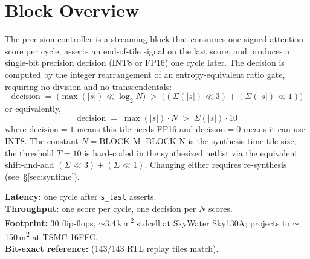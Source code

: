 \documentclass[11pt]{article}
\begin{document}
\tableofcontents
\clearpage

\section{Block Overview}
\label{sec:overview}

The precision controller is a streaming block that consumes one signed
attention score per cycle, asserts an end-of-tile signal on the last score,
and produces a single-bit precision decision (INT8 or FP16) one cycle later.
The decision is computed by the integer rearrangement of an entropy-equivalent
ratio gate, requiring no division and no transcendentals:
\begin{equation*}
\mathrm{decision} \;=\; \bigl(\max(|s|) \ll \log_2 N\bigr) \;>\;
\bigl((\Sigma(|s|) \ll 3) + (\Sigma(|s|) \ll 1)\bigr)
\end{equation*}
or equivalently,
\begin{equation*}
\mathrm{decision} \;=\; \max(|s|) \cdot N \;>\; \Sigma(|s|) \cdot 10
\end{equation*}
where $\mathrm{decision} = 1$ means this tile needs FP16 and
$\mathrm{decision} = 0$ means it can use INT8. The constant $N = \mathrm{BLOCK\_M}
\cdot \mathrm{BLOCK\_N}$ is the synthesis-time tile size; the threshold $T = 10$
is hard-coded in the synthesized netlist via the equivalent shift-and-add
$(\Sigma \ll 3) + (\Sigma \ll 1)$. Changing either requires re-synthesis
(see~\S\ref{sec:syntime}).

\medskip
\noindent\textbf{Latency:} one cycle after \texttt{s\_last} asserts.\\
\textbf{Throughput:} one score per cycle, one decision per $N$ scores.\\
\textbf{Footprint:} 30 flip-flops, $\sim$3.4\,k\,\textmu m\textsuperscript{2} stdcell at
SkyWater Sky130A; projects to $\sim$150\,\textmu m\textsuperscript{2} at TSMC 16FFC.\\
\textbf{Bit-exact reference:} 
(143/143 RTL replay tiles match).

\end{document}
